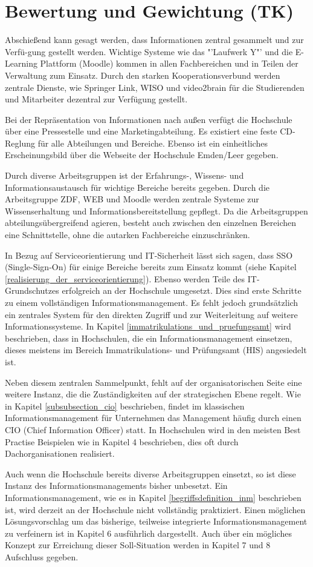 \section{Bewertung und Gewichtung (TK)}
\label{section_bewertung_gewichtung}
Abschießend kann gesagt werden, dass Informationen zentral gesammelt und zur Verfü-gung gestellt werden. 
Wichtige Systeme wie das "'Laufwerk Y"' und die E-Learning Plattform (Moodle) kommen in allen 
Fachbereichen und in Teilen der Verwaltung zum Einsatz. Durch den starken Kooperationsverbund werden 
zentrale Dienste, wie Springer Link, WISO und video2brain für die Studierenden und Mitarbeiter dezentral zur 
Verfügung gestellt. 

Bei der Repräsentation von Informationen nach außen verfügt die Hochschule über eine Pressestelle und eine 
Marketingabteilung. Es existiert eine feste CD-Reglung für alle Abteilungen und Bereiche. Ebenso ist ein 
einheitliches Erscheinungsbild über die Webseite der Hochschule Emden/Leer gegeben.

Durch diverse Arbeitsgruppen ist der Erfahrungs-, Wissens- und Informationsaustausch für wichtige Bereiche 
bereits gegeben. Durch die Arbeitsgruppe ZDF, WEB und Moodle werden zentrale Systeme zur 
Wissenserhaltung und Informationsbereitstellung gepflegt. Da die Arbeitsgruppen abteilungsübergreifend 
agieren, besteht auch zwischen den einzelnen Bereichen eine Schnittstelle, ohne die autarken Fachbereiche 
einzuschränken. 

In Bezug auf Serviceorientierung und IT-Sicherheit lässt sich sagen, dass SSO (Single-Sign-On) für einige 
Bereiche bereits zum Einsatz kommt (siehe Kapitel \ref{realisierung_der_serviceorientierung}). Ebenso werden 
Teile des IT-Grundschutzes erfolgreich an der Hochschule umgesetzt. Dies sind erste Schritte zu einem 
vollständigen Informationsmanagement. Es fehlt jedoch grundsätzlich ein zentrales System für den direkten 
Zugriff und zur Weiterleitung auf weitere Informationssysteme. In Kapitel 
\ref{immatrikulations_und_pruefungsamt} wird beschrieben, dass in Hochschulen, die ein 
Informationsmanagement einsetzen, dieses meistens im Bereich Immatrikulations- und Prüfungsamt (HIS) 
angesiedelt ist. 

Neben diesem zentralen Sammelpunkt, fehlt auf der organisatorischen Seite eine weitere Instanz, die die 
Zuständigkeiten auf der strategischen Ebene regelt. Wie in Kapitel \ref{subsubsection_cio} beschrieben, findet im 
klassischen Informationsmanagement für Unternehmen das Management häufig durch einen CIO (Chief 
Information Officer) statt. In Hochschulen wird in den meisten Best Practise Beispielen wie in Kapitel 4 
beschrieben, dies oft durch Dachorganisationen realisiert.

Auch wenn die Hochschule bereits diverse Arbeitsgruppen einsetzt, so ist diese Instanz des 
Informationsmanagements bisher unbesetzt. Ein Informationsmanagement, wie es in Kapitel 
\ref{begriffsdefinition_inm} beschrieben ist, wird derzeit an der Hochschule nicht vollständig praktiziert. Einen 
möglichen Lösungsvorschlag um das bisherige, teilweise integrierte Informationsmanagement zu verfeinern 
ist in Kapitel 6 ausführlich dargestellt. Auch über ein mögliches Konzept zur Erreichung dieser Soll-Situation 
werden in Kapitel 7 und 8 Aufschluss gegeben.